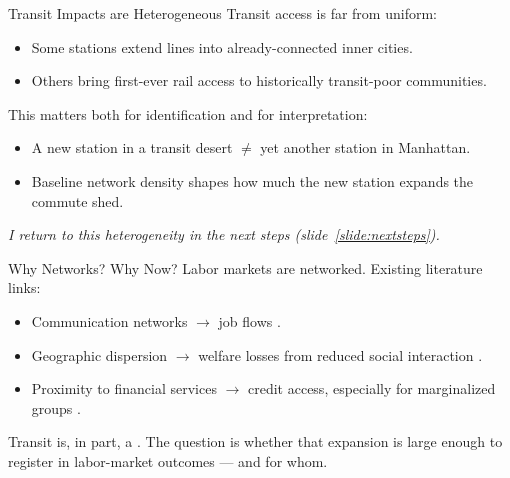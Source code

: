 \begin{frame}[label=heterogeneous]{Transit Impacts are Heterogeneous}
\small
Transit access is far from uniform:
\bigskip
\begin{itemize}
  \item Some stations extend lines into already-connected inner cities.
  \item Others bring first-ever rail access to historically transit-poor communities.
\end{itemize}
\bigskip
This matters both for identification and for interpretation:
\begin{itemize}
  \item A new station in a transit desert $\neq$ yet another station in Manhattan.
  \item Baseline network density shapes how much the new station expands the commute shed.
\end{itemize}
\bigskip
\textit{I return to this heterogeneity in the next steps
(slide~\ref{slide:nextsteps}).}
\end{frame}
\begin{frame}[label=networks]{Why Networks? Why Now?}
\small
Labor markets are networked. Existing literature links:
\bigskip
\begin{itemize}
  \item Communication networks $\to$ job flows \parencite{patacchini_referral_fx}.
  \item Geographic dispersion $\to$ welfare losses from reduced social interaction
        \parencite{kimSpatialInteractions2023}.
  \item Proximity to financial services $\to$ credit access, especially for marginalized
        groups \parencite{Relihan2017BranchesIL}.
\end{itemize}
\bigskip
Transit is, in part, a . The question is whether
that expansion is large enough to register in labor-market outcomes --- and for whom.
\end{frame}

